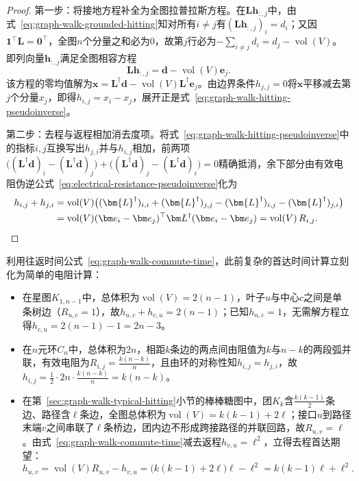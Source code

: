 \begin{proof}
第一步：将接地方程补全为全图拉普拉斯方程。在$\bm L\bm h_{:,j}$中，由式~\eqref{eq:graph-walk-grounded-hitting}知对所有$i\neq j$有$(\bm L\bm h_{:,j})_i=d_i$；又因$\bm 1^\top\bm L=\bm 0^\top$，全图$n$个分量之和必为$0$，故第$j$行必为$-\sum_{i\neq j}d_i=d_j-\operatorname{vol}(V)$。即列向量$\bm h_{:,j}$满足全图相容方程
\begin{equation}
\bm{L}\bm{h}_{:,j}=\bm{d}-\operatorname{vol}(V)\bm{e}_j.
\label{eq:graph-walk-full-hitting}
\end{equation}
该方程的零均值解为$\bm x=\bm L^\dagger\bm d-\operatorname{vol}(V)\bm L^\dagger\bm e_j$。由边界条件$h_{j,j}=0$将$\bm x$平移减去第$j$个分量$x_j$，即得$h_{i,j}=x_i-x_j$，展开正是式~\eqref{eq:graph-walk-hitting-pseudoinverse}。

第二步：去程与返程相加消去度项。将式~\eqref{eq:graph-walk-hitting-pseudoinverse}中的指标$i,j$互换写出$h_{j,i}$并与$h_{i,j}$相加，前两项$\bigl((\bm L^\dagger\bm d)_i-(\bm L^\dagger\bm d)_j\bigr)+\bigl((\bm L^\dagger\bm d)_j-(\bm L^\dagger\bm d)_i\bigr)=0$精确抵消，余下部分由有效电阻伪逆公式~\eqref{eq:electrical-resistance-pseudoinverse}化为
\[
\begin{aligned}
h_{i,j}+h_{j,i}
&=\operatorname{vol}(V)\bigl((\bm{L}^\dagger)_{i,i}+(\bm{L}^\dagger)_{j,j}
-(\bm{L}^\dagger)_{i,j}-(\bm{L}^\dagger)_{j,i}\bigr)\\
&=\operatorname{vol}(V)(\bm e_i-\bm e_j)^\top\bm L^\dagger(\bm e_i-\bm e_j)
=\operatorname{vol}(V)\,R_{i,j}.\qedhere
\end{aligned}
\]
\end{proof}

利用往返时间公式~\eqref{eq:graph-walk-commute-time}，此前复杂的首达时间计算立刻化为简单的电阻计算：
\begin{itemize}
\item 在星图$K_{1,n-1}$中，总体积为$\operatorname{vol}(V)=2(n-1)$，叶子$u$与中心$c$之间是单条树边（$R_{u,c}=1$），故$h_{u,c}+h_{c,u}=2(n-1)$；已知$h_{u,c}=1$，无需解方程立得$h_{c,u}=2(n-1)-1=2n-3$。
\item 在$n$元环$C_n$中，总体积为$2n$，相距$k$条边的两点间由阻值为$k$与$n-k$的两段弧并联，有效电阻为$R_{i,j}=\frac{k(n-k)}{n}$，且由环的对称性知$h_{i,j}=h_{j,i}$，故$h_{i,j}=\frac12\cdot 2n\cdot\frac{k(n-k)}{n}=k(n-k)$。
\item 在第~\ref{sec:graph-walk-typical-hitting}小节的棒棒糖图中，团$K_k$含$\frac{k(k-1)}{2}$条边、路径含$\ell$条边，全图总体积为$\operatorname{vol}(V)=k(k-1)+2\ell$；接口$u$到路径末端$v$之间串联了$\ell$条桥边，团内边不形成跨接路径的并联回路，故$R_{u,v}=\ell$。由式~\eqref{eq:graph-walk-commute-time}减去返程$h_{v,u}=\ell^2$，立得去程首达期望：
\[
  h_{u,v} = \operatorname{vol}(V)R_{u,v} - h_{v,u} = \bigl(k(k-1)+2\ell\bigr)\ell - \ell^2 = k(k-1)\ell + \ell^2.
\]
\end{itemize}

